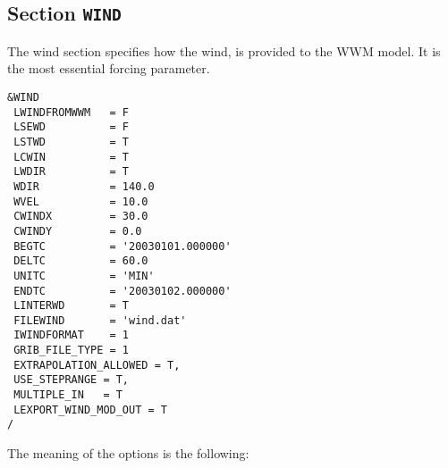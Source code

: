 \documentclass[12pt]{amsart}
\begin{document}
\subsection{Section {\tt WIND}}
The wind section specifies how the wind, is provided to the WWM model. It is the most essential forcing parameter.
\begin{verbatim}
&WIND
 LWINDFROMWWM   = F      
 LSEWD          = F      
 LSTWD          = T      
 LCWIN          = T      
 LWDIR          = T      
 WDIR           = 140.0  
 WVEL           = 10.0   
 CWINDX         = 30.0   
 CWINDY         = 0.0    
 BEGTC          = '20030101.000000'
 DELTC          = 60.0             
 UNITC          = 'MIN'            
 ENDTC          = '20030102.000000'
 LINTERWD       = T                
 FILEWIND       = 'wind.dat'       
 IWINDFORMAT    = 1                
 GRIB_FILE_TYPE = 1
 EXTRAPOLATION_ALLOWED = T,
 USE_STEPRANGE = T,
 MULTIPLE_IN   = T 
 LEXPORT_WIND_MOD_OUT = T
/
\end{verbatim}
The meaning of the options is the following:
\end{document}
